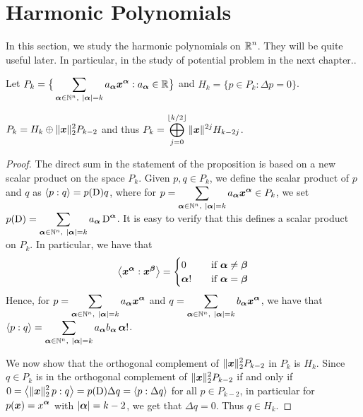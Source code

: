 \section{Harmonic Polynomials} \label{SectHramPoly}

In this section, we study the harmonic polynomials on
$\displaystyle \mathbb{R}^n$.  They will be quite useful later.  In particular, in the
study of potential problem in the next chapter..

Let $\displaystyle P_k
= \big\{ \sum_{{\bm{\alpha}} \in \mathbb{N}^n,\ |{\bm{\alpha}}| = k} a_{{\bm{\alpha}}}
{\bm{x}}^{{\bm{\alpha}}} : a_{{\bm{\alpha}}} \in \mathbb{R}  \big\}$
and $H_k = \{ p \in P_k : \Delta p = 0 \}$.

\begin{prop} \label{PkHkrPkm2}
$\displaystyle P_k = H_k \oplus \|{\bm{x}}\|_2^2 P_{k-2}$ and thus
$\displaystyle P_k = \bigoplus_{j=0}^{\lfloor{k/2}\rfloor} \|{\bm{x}}\|^{2j} H_{k-2j}$.
\end{prop}

\begin{proof}
The direct sum in the statement of the proposition is based on a new
scalar product on the space $P_k$.  Given $p,q \in P_k$, we define the
scalar product of $p$ and $q$ as $\left\langle{p} : {q}\right\rangle = p(\operatorname{D}) q$, where
for $\DS p = \sum_{\VEC{\alpha} \in \NN^n,\ |\VEC{\alpha}| = k}
a_{\VEC{\alpha}} \VEC{x}^{\VEC{\alpha}} \in P_k$, we set
$\DS p(\diff) = \sum_{\VEC{\alpha} \in \NN^n,\ |\VEC{\alpha}| = k}
a_{\VEC{\alpha}} \diff^{\VEC{\alpha}}$.
It is easy to verify that this defines a scalar product on $P_k$.
In particular, we have that
\[
\left\langle{{\bm{x}}^{{\bm{\alpha}}}} : {{\bm{x}}^{{\bm{\beta}}}}\right\rangle =
\begin{cases}
0 & \quad \text{if} \ {\bm{\alpha}} \neq {\bm{\beta}} \\
{\bm{\alpha}}! & \quad \text{if} \ {\bm{\alpha}} = {\bm{\beta}} \\
\end{cases}
\]
Hence, for
$\displaystyle p = \sum_{{\bm{\alpha}} \in \mathbb{N}^n,\ |{\bm{\alpha}}| = k}
a_{{\bm{\alpha}}} {\bm{x}}^{{\bm{\alpha}}}$ and
$\DS q = \sum_{\VEC{\alpha} \in \NN^n,\ |\VEC{\alpha}| = k}
b_{\VEC{\alpha}} \VEC{x}^{\VEC{\alpha}}$, we have that\\
$\displaystyle \left\langle{p} : {q}\right\rangle = \sum_{{\bm{\alpha}} \in \mathbb{N}^n,\ |{\bm{\alpha}}| = k}
a_{{\bm{\alpha}}} b_{{\bm{\alpha}}} \, {\bm{\alpha}}!$.

We now show that the orthogonal complement of
$\displaystyle \|{\bm{x}}\|_2^2 P_{k-2}$
in $P_k$ is $H_k$.  Since $q \in P_k$ is in the orthogonal complement 
of $\displaystyle \|{\bm{x}}\|_2^2 P_{k-2}$ if and only if
$\displaystyle 0 = \left\langle{\|{\bm{x}}\|_2^2\, p} : {q}\right\rangle =  p(\operatorname{D}) \Delta q
= \left\langle{p} : {\Delta q}\right\rangle$ for all $p \in P_{k-2}$, in particular for
$\displaystyle p({\bm{x}}) = x^{{\bm{\alpha}}}$ with $|{\bm{\alpha}}| = k-2$,
we get that $\Delta q = 0$.  Thus $q \in H_k$.
\end{proof}

